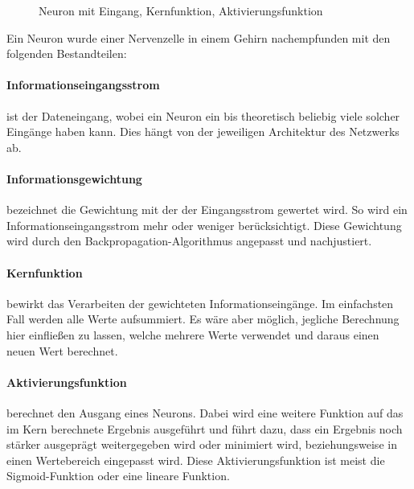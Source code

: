 \begin{figure}
\centering


	\caption{Neuron mit Eingang, Kernfunktion, Aktivierungsfunktion}
	\label{fig:Neuron}
\end{figure}

Ein Neuron wurde einer Nervenzelle in einem Gehirn nachempfunden mit den folgenden Bestandteilen:
\paragraph{Informationseingangsstrom} ist der Dateneingang, wobei ein Neuron ein bis theoretisch beliebig viele solcher Eingänge haben kann. 
Dies hängt von der jeweiligen Architektur des Netzwerks ab.

\paragraph{Informationsgewichtung} bezeichnet die Gewichtung mit der der Eingangsstrom gewertet wird. 
So wird ein Informationseingangsstrom mehr oder weniger berücksichtigt. 
Diese Gewichtung wird durch den Backpropagation-Algorithmus angepasst und nachjustiert.

\paragraph{Kernfunktion} bewirkt das Verarbeiten der gewichteten Informationseingänge. 
Im einfachsten Fall werden alle Werte aufsummiert. 
Es wäre aber möglich, jegliche Berechnung hier einfließen zu lassen, welche mehrere Werte verwendet und daraus einen neuen Wert berechnet.

\paragraph{Aktivierungsfunktion} berechnet den Ausgang eines Neurons. 
Dabei wird eine weitere Funktion auf das im Kern berechnete Ergebnis ausgeführt und führt dazu, dass ein Ergebnis noch stärker ausgeprägt weitergegeben wird oder minimiert wird, beziehungsweise in einen Wertebereich eingepasst wird. 
Diese Aktivierungsfunktion ist meist die Sigmoid-Funktion oder eine lineare Funktion. 

